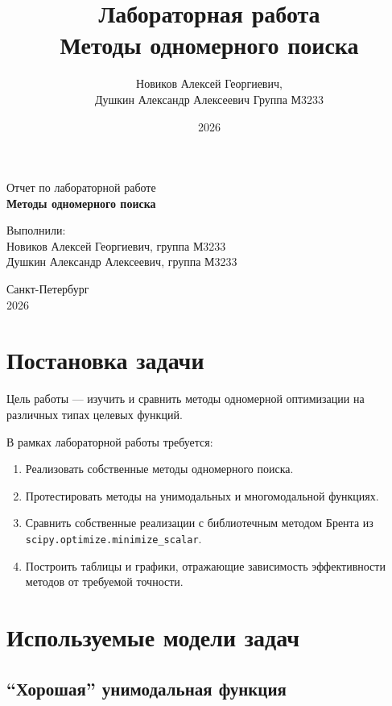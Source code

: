 \documentclass[14pt,a4paper]{extarticle}
\title{Лабораторная работа \\ Методы одномерного поиска}
\author{
    Новиков Алексей Георгиевич, \\ Душкин Александр Алексеевич
    Группа М3233
}
\date{2026}
\begin{document}
\begin{titlepage}
    \begin{center}
        {\large Отчет по лабораторной работе} \\[0.5cm]
        {\LARGE \textbf{Методы одномерного поиска}} \\[2cm]

        \begin{flushright}
            Выполнили: \\[0.2cm]
            Новиков Алексей Георгиевич, группа М3233 \\
            Душкин Александр Алексеевич, группа М3233 \\[0.5cm]
        \end{flushright}

        \vfill
        Санкт-Петербург \\[0.2cm]
        2026
    \end{center}
\end{titlepage}

\tableofcontents
\newpage

\section{Постановка задачи}

Цель работы --- изучить и сравнить методы одномерной оптимизации на различных типах целевых функций.

В рамках лабораторной работы требуется:
\begin{enumerate}
    \item Реализовать собственные методы одномерного поиска.
    \item Протестировать методы на унимодальных и многомодальной функциях.
    \item Сравнить собственные реализации с библиотечным методом Брента из \texttt{scipy.optimize.minimize\_scalar}.
    \item Построить таблицы и графики, отражающие зависимость эффективности методов от требуемой точности.
\end{enumerate}

\section{Используемые модели задач}

\subsection{``Хорошая'' унимодальная функция}
\end{document}
